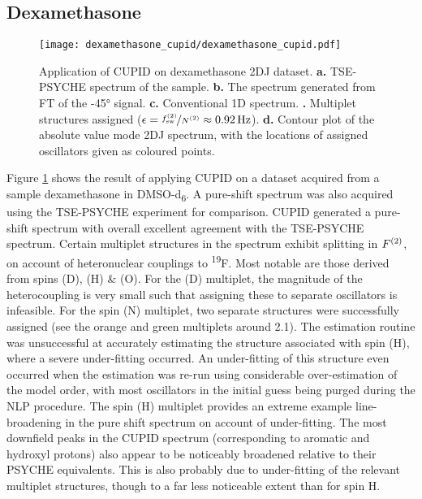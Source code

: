 \subsection{Dexamethasone}

\begin{sidewaysfigure}%
    \centering%
    \texttt{[image: dexamethasone\_cupid/dexamethasone\_cupid.pdf]}%
    \caption[
        Application of \acs{CUPID} on a dexamethasone dataset.
    ]{
        Application of \acs{CUPID} on dexamethasone \ac{2DJ} dataset.
        \textbf{a.} \acs{TSE-PSYCHE} spectrum of the sample.
        \textbf{b.} The spectrum generated from \ac{FT} of the \ang{-45}
        signal.
        \textbf{c.} Conventional \acs{1D} spectrum.
        \textbf{.} Multiplet structures assigned ($\epsilon =
        \nicefrac{f_{\mathrm{sw}}^{(2)}}{N^{(2)}} \approx \qty{0.92}{\hertz}$).
        \textbf{d.} Contour plot of the absolute value mode \acs{2DJ} spectrum,
        with the locations of assigned oscillators given as coloured points.
    }
    \label{fig:dexamethasone-cupid}%
\end{sidewaysfigure}%

Figure \ref{fig:dexamethasone-cupid} shows the result of applying CUPID on a
dataset acquired from a sample dexamethasone in DMSO-d\textsubscript{6}. A
pure-shift spectrum was also acquired using the
\ac{TSE-PSYCHE} experiment\cite{Foroozandeh2018,Foroozandeh2015} for
comparison.
\ac{CUPID} generated a pure-shift spectrum with overall excellent agreement
with the \ac{TSE-PSYCHE} spectrum. Certain multiplet structures in the spectrum exhibit
splitting in $F^{(2)}$, on account of heteronuclear couplings to \textsuperscript{19}F. Most
notable are those derived from spins (D), (H) \& (O). For the (D) multiplet, the
magnitude of the heterocoupling is very small such that assigning these to
separate oscillators is infeasible.
For the spin (N) multiplet, two separate structures were successfully assigned
(see the orange and green multiplets around \qty{2.1}{\partspermillion}).
The estimation routine was unsuccessful at accurately estimating the structure
associated with spin (H), where a severe under-fitting occurred. An under-fitting
of this structure even occurred when the estimation was re-run using
considerable over-estimation of the model order, with most oscillators in the
initial guess being purged during the \ac{NLP} procedure.
The spin (H) multiplet provides an extreme example line-broadening in the pure
shift spectrum on account of under-fitting. The most downfield peaks in the
CUPID spectrum (corresponding to aromatic and hydroxyl protons) also appear to
be noticeably broadened relative to their PSYCHE equivalents. This is also
probably due to under-fitting of the relevant multiplet structures, though to a
far less noticeable extent than for spin H. 


